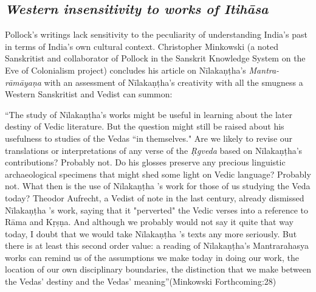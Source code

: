 \subsection*{\textit{Western insensitivity to works of Itihāsa}}

Pollock’s writings lack sensitivity to the peculiarity of understanding India’s past in terms of India’s own cultural context. Christopher Minkowski (a noted Sanskritist and collaborator of Pollock in the Sanskrit Knowledge System on the Eve of Colonialism project) concludes his article on Nīlakaṇṭha’s \textit{Mantra-rāmāyaṇa} with an assessment of Nīlakaṇṭha’s creativity with all the smugness a Western Sanskritist and Vedist can summon:

\begin{myquote}
“The study of Nīlakaṇṭha's works might be useful in learning about the later destiny of Vedic literature. But the question might still be raised about his usefulness to studies of the Vedas “in themselves." Are we likely to revise our translations or interpretations of any verse of the \textit{Ṛgveda} based on Nīlakaṇṭha's contributions? Probably not. Do his glosses preserve any precious linguistic archaeological specimens that might shed some light on Vedic language? Probably not. What then is the use of Nīlakaṇṭha 's work for those of us studying the Veda today? Theodor Aufrecht, a Vedist of note in the last century, already dismissed Nīlakaṇṭha 's work, saying that it "perverted" the Vedic verses into a reference to Rāma and Kṛṣṇa. And although we probably would not say it quite that way today, I doubt that we would take Nīlakaṇṭha 's texts any more seriously. But there is at least this second order value: a reading of Nīlakaṇṭha's Mantrarahasya works can remind us of the assumptions we make today in doing our work, the location of our own disciplinary boundaries, the distinction that we make between the Vedas' destiny and the Vedas' meaning”\hfill (Minkowski Forthcoming:28)
\end{myquote}

